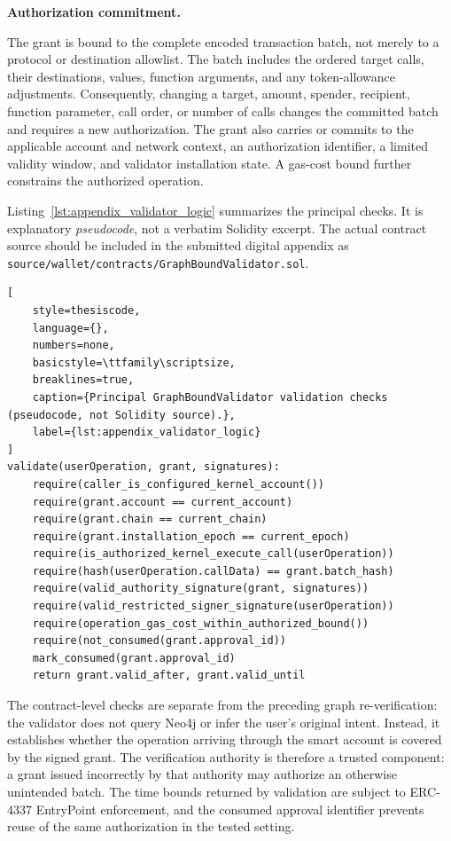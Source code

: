 \medskip
\noindent\textbf{Authorization commitment.}

The grant is bound to the complete encoded transaction batch,
not merely to a protocol or destination allowlist. The batch
includes the ordered target calls, their destinations, values,
function arguments, and any token-allowance adjustments.
Consequently, changing a target, amount, spender, recipient,
function parameter, call order, or number of calls changes the
committed batch and requires a new authorization. The grant
also carries or commits to the applicable account and network
context, an authorization identifier, a limited validity window,
and validator installation state. A gas-cost bound further
constrains the authorized operation.

Listing~\ref{lst:appendix_validator_logic} summarizes the
principal checks. It is explanatory \emph{pseudocode}, not a
verbatim Solidity excerpt. The actual contract source should
be included in the submitted digital appendix as
\texttt{source/wallet/contracts/GraphBoundValidator.sol}.

\begin{lstlisting}[
    style=thesiscode,
    language={},
    numbers=none,
    basicstyle=\ttfamily\scriptsize,
    breaklines=true,
    caption={Principal GraphBoundValidator validation checks (pseudocode, not Solidity source).},
    label={lst:appendix_validator_logic}
]
validate(userOperation, grant, signatures):
    require(caller_is_configured_kernel_account())
    require(grant.account == current_account)
    require(grant.chain == current_chain)
    require(grant.installation_epoch == current_epoch)
    require(is_authorized_kernel_execute_call(userOperation))
    require(hash(userOperation.callData) == grant.batch_hash)
    require(valid_authority_signature(grant, signatures))
    require(valid_restricted_signer_signature(userOperation))
    require(operation_gas_cost_within_authorized_bound())
    require(not_consumed(grant.approval_id))
    mark_consumed(grant.approval_id)
    return grant.valid_after, grant.valid_until
\end{lstlisting}

The contract-level checks are separate from the preceding
graph re-verification: the validator does not query Neo4j or
infer the user's original intent. Instead, it establishes
whether the operation arriving through the smart account is
covered by the signed grant. The verification authority is
therefore a trusted component: a grant issued incorrectly by
that authority may authorize an otherwise unintended batch.
The time bounds returned by validation are subject to ERC-4337
EntryPoint enforcement, and the consumed approval identifier
prevents reuse of the same authorization in the tested setting.

